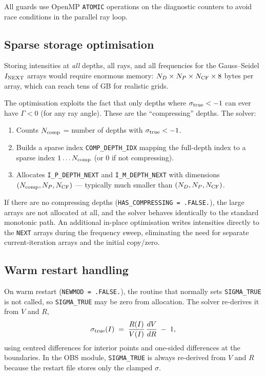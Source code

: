 \documentclass[11pt]{article}
\begin{document}
All guards use OpenMP \texttt{ATOMIC} operations on the diagnostic
counters to avoid race conditions in the parallel ray loop.

\subsection{Sparse storage optimisation}

Storing intensities at \emph{all} depths, all rays, and all frequencies
for the Gauss--Seidel $I_{\rm NEXT}$ arrays would require enormous
memory: $N_D \times N_P \times N_{\rm CF} \times 8$ bytes per array,
which can reach tens of GB for realistic grids.

The optimisation exploits the fact that only depths where
$\sigma_{\rm true} < -1$ can ever have $\Gamma < 0$ (for any ray angle).
These are the ``compressing'' depths.  The solver:

\begin{enumerate}[nosep]
  \item Counts $N_{\rm comp}$ = number of depths with
        $\sigma_{\rm true} < -1$.
  \item Builds a sparse index \texttt{COMP\_DEPTH\_IDX} mapping the
        full-depth index to a sparse index $1 \ldots N_{\rm comp}$
        (or 0 if not compressing).
  \item Allocates \texttt{I\_P\_DEPTH\_NEXT} and
        \texttt{I\_M\_DEPTH\_NEXT} with dimensions
        $(N_{\rm comp}, N_P, N_{\rm CF})$ --- typically much smaller
        than $(N_D, N_P, N_{\rm CF})$.
\end{enumerate}

If there are no compressing depths
(\texttt{HAS\_COMPRESSING = .FALSE.}), the large arrays are not
allocated at all, and the solver behaves identically to the standard
monotonic path.  An additional in-place optimisation writes intensities
directly to the \texttt{NEXT} arrays during the frequency sweep,
eliminating the need for separate current-iteration arrays and the
initial copy/zero.

\subsection{Warm restart handling}

On warm restart (\texttt{NEWMOD = .FALSE.}), the routine that normally
sets \texttt{SIGMA\_TRUE} is not called, so \texttt{SIGMA\_TRUE} may be
zero from allocation.  The solver re-derives it from $V$ and $R$,
\[
  \sigma_{\rm true}(I) \;=\; \frac{R(I)}{V(I)}\,\frac{dV}{dR} \;-\; 1,
\]
using centred differences for interior points and one-sided differences
at the boundaries.  In the OBS module, \texttt{SIGMA\_TRUE} is always
re-derived from $V$ and $R$ because the restart file stores only the
clamped $\sigma$.
\end{document}
